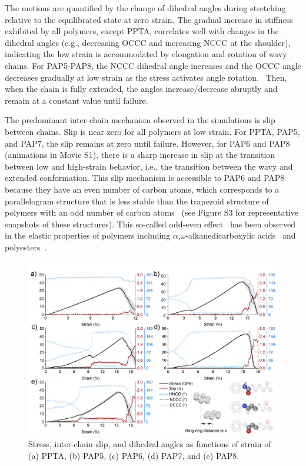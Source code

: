 \documentclass[journal=langd5,manuscript=article]{achemso}
\begin{document}
The motions are quantified by the change of dihedral angles during stretching relative to the equilibrated state at zero strain.
The gradual increase in stiffness exhibited by all polymers, except PPTA, correlates well with changes in the dihedral angles (e.g., decreasing OCCC and increasing NCCC at the shoulder), indicating the low strain is accommodated by elongation and rotation of wavy chains.
For PAP5-PAP8, the NCCC dihedral angle increases and the OCCC angle decreases gradually at low strain as the stress activates angle rotation.~\cite{tonelli2020poly} 
Then, when the chain is fully extended, the angles increase/decrease abruptly and remain at a constant value until failure.  


The predominant inter-chain mechanism observed in the simulations is slip between chains.
Slip is near zero for all polymers at low strain.
For PPTA, PAP5, and PAP7, the slip remains at zero until failure.
However, for PAP6 and PAP8 (animations in Movie S1), there is a sharp increase in slip at the transition between low and high-strain behavior, i.e., the transition between the wavy and extended conformation.
This slip mechanism is accessible to PAP6 and PAP8 because they have an even number of carbon atoms, which corresponds to a parallelogram structure that is less stable than the trapezoid structure of polymers with an odd number of carbon atoms ~\cite{thalladi2000melting,white2008room,bond2004crystal}(see Figure S3 for representative snapshots of these structures).
This so-called odd-even effect~\cite{baeyer1877ueber,thalladi2000melting} has been observed in the elastic properties of polymers including $\alpha$,$\omega$-alkanedicarboxylic acids~\cite{mishra2013odd} and polyesters~\cite{shen2017facile}.
\begin{figure}[h!]
\centering
\includegraphics[scale=0.55]{Slip-and-Rotation-vs-Strain.png}
\caption{Stress, inter-chain slip, and dihedral angles as functions of strain of (a) PPTA, (b) PAP5, (c) PAP6, (d) PAP7, and (e) PAP8.}
\label{fig:Slip-and-Rotation-vs-Strain}
\end{figure}
\end{document}
